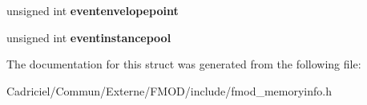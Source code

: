 \begin{DoxyCompactItemize}
\item 
unsigned int {\bfseries eventenvelopepoint}\hypertarget{struct_f_m_o_d___m_e_m_o_r_y___u_s_a_g_e___d_e_t_a_i_l_s_aeec51fe4108d9f383c5db076dcac34be}{}\label{struct_f_m_o_d___m_e_m_o_r_y___u_s_a_g_e___d_e_t_a_i_l_s_aeec51fe4108d9f383c5db076dcac34be}

\item 
unsigned int {\bfseries eventinstancepool}\hypertarget{struct_f_m_o_d___m_e_m_o_r_y___u_s_a_g_e___d_e_t_a_i_l_s_ac75baf7e2a3500aeab9a968276fa010c}{}\label{struct_f_m_o_d___m_e_m_o_r_y___u_s_a_g_e___d_e_t_a_i_l_s_ac75baf7e2a3500aeab9a968276fa010c}

\end{DoxyCompactItemize}


The documentation for this struct was generated from the following file\+:\begin{DoxyCompactItemize}
\item 
Cadriciel/\+Commun/\+Externe/\+F\+M\+O\+D/include/fmod\+\_\+memoryinfo.\+h\end{DoxyCompactItemize}
